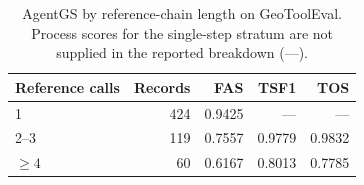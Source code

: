 \begin{table}[t]
\caption{AgentGS by reference-chain length on GeoToolEval. Process scores for the single-step stratum are not supplied in the reported breakdown (---).}
\label{tab:chain-results}
\centering
\begin{tabular}{@{}lrrrr@{}}
\toprule
Reference calls & Records & FAS & TSF1 & TOS \\
\midrule
1 & 424 & 0.9425 & --- & --- \\
2--3 & 119 & 0.7557 & 0.9779 & 0.9832 \\
$\geq4$ & 60 & 0.6167 & 0.8013 & 0.7785 \\
\bottomrule
\end{tabular}
\end{table}
